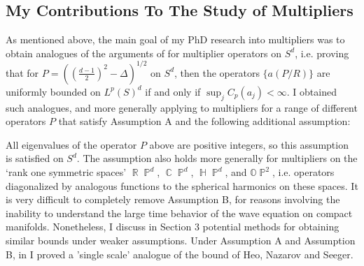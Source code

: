 \documentclass[11pt]{article}
\DeclareMathOperator{\RR}{\mathbb{R}}
\DeclareMathOperator{\HH}{\mathbb{H}}
\DeclareMathOperator{\CC}{\mathbb{C}}
\DeclareMathOperator{\PP}{\mathbb{P}}
\begin{document}




\subsection{My Contributions To The Study of Multipliers} \label{ContributionMultipliers}

As mentioned above, the main goal of my PhD research into multipliers was to obtain analogues of the arguments of \cite{HeoNazarovSeeger,Cladek,KimQuasiradial} for multiplier operators on $S^d$, i.e. proving that for $P = ( ({\scriptstyle \frac{d-1}{2} })^2 - \Delta )^{1/2}$ on $S^d$, then the operators $\{ a(P/R) \}$ are uniformly bounded on $L^p(S)^d$ if and only if $\sup_j C_p(a_j) < \infty$. I obtained such analogues, and more generally applying to multipliers for a range of different operators $P$ that satisfy Assumption A and the following additional assumption:
%
\begin{center}
\end{center}
%
All eigenvalues of the operator $P$ above are positive integers, so this assumption is satisfied on $S^d$. The assumption also holds more generally for multipliers on the `rank one symmetric spaces' $\RR \PP^d$, $\CC \PP^d$, $\HH \PP^d$, and $\mathbb{O} \PP^2$, i.e. operators diagonalized by analogous functions to the spherical harmonics on these spaces. It is very difficult to completely remove Assumption B, for reasons involving the inability to understand the large time behavior of the wave equation on compact manifolds. Nonetheless, I discuss in Section 3 potential methods for obtaining similar bounds under weaker assumptions. Under Assumption A and Assumption B, in \cite{DensonCharacterization} I proved a 'single scale' analogue of the bound of Heo, Nazarov and Seeger.
\end{document}
